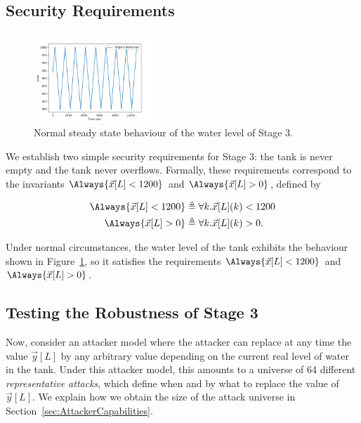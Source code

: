 \subsection*{Security Requirements}
\begin{figure} 
  \centering
  \includegraphics[width=0.4\textwidth]{Figures/Stage3Normal.png}
  \vspace{-0.25cm}
  \caption{Normal steady state behaviour of the water level of Stage 3.}
  \label{fig:Stage3Normal}
  \vspace{-1.5cm}
\end{figure}
We establish two simple security requirements for Stage 3: the tank is never empty and the tank never overflows. Formally, these requirements correspond to the invariants $\Always{\vec{x}[L]< 1200}$ and $\Always{\vec{x}[L]> 0}$, defined by

\begin{minipage}{0.5\textwidth}
  \begin{align*}
    \Always{\vec{x}[L]< 1200}&\triangleq \forall k.\vec{x}[L](k)< 1200\\
    \Always{\vec{x}[L]> 0}&\triangleq \forall k.\vec{x}[L](k)> 0.
  \end{align*}
\end{minipage}

Under normal circumstances, the water level of the tank exhibits the behaviour shown in Figure~\ref{fig:Stage3Normal}, so it satisfies the requirements $\Always{\vec{x}[L]< 1200}$ and $\Always{\vec{x}[L]> 0}$.
\subsection*{Testing the Robustness of Stage 3}
Now, consider an attacker model where the attacker can replace at any time the value $\vec{y}[L]$ by any arbitrary value depending on the current real level of water in the tank. 
Under this attacker model, this amounts to a universe of 64 different \emph{representative attacks}, which define when and by what to replace the value of $\vec{y}[L]$. 
We explain how we obtain the size of the attack universe in Section~\ref{sec:AttackerCapabilities}. 

